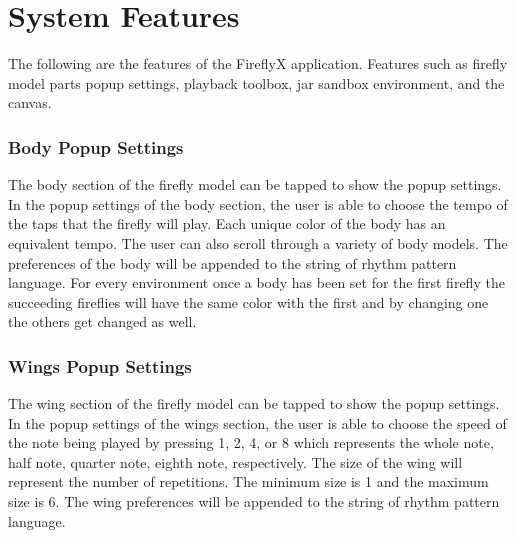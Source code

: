 \section{System Features}
The following are the features of the FireflyX application. Features such as firefly model parts popup settings, playback toolbox, jar sandbox environment, and the canvas.


\subsubsection{Body Popup Settings}
The body section of the firefly model can be tapped to show the popup settings. In the popup settings of the body section, the user is able to choose the tempo of the taps that the firefly will play. Each unique color of the body has an equivalent tempo. The user can also scroll through a variety of body models. The preferences of the body will be appended to the string of rhythm pattern language. For every environment once a body has been set for the first firefly the succeeding fireflies will have the same color with the first and by changing one the others get changed as well.

\subsubsection{Wings Popup Settings}
The wing section of the firefly model can be tapped to show the popup settings. In the popup settings of the wings section, the user is able to choose the speed of the note being played by pressing 1, 2, 4, or 8 which represents the whole note, half note, quarter note, eighth note, respectively. The size of the wing will represent the number of repetitions. The minimum size is 1 and the maximum size is 6. The wing preferences will be appended to the string of rhythm pattern language.

